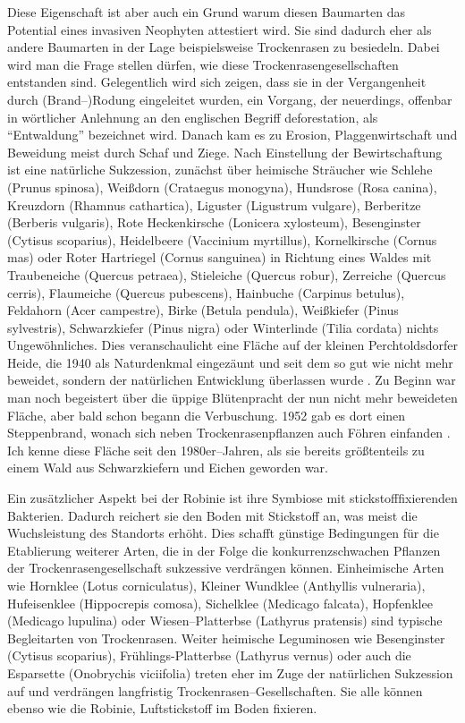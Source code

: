 \documentclass[twocolumn]{scrartcl}
\begin{document}
Diese Eigenschaft ist aber auch ein Grund warum diesen Baumarten das Potential
eines invasiven Neophyten attestiert wird. Sie sind dadurch eher als andere
Baumarten in der Lage beispielsweise Trockenrasen zu besiedeln. Dabei wird man
die Frage stellen dürfen, wie diese Trockenrasengesellschaften entstanden sind.
Gelegentlich wird sich zeigen, dass sie in der Vergangenheit durch
(Brand\mbox{--)}Rodung eingeleitet wurden, ein Vorgang, der neuerdings, offenbar
in wörtlicher Anlehnung an den englischen Begriff deforestation, als
\enquote{Entwaldung} bezeichnet wird. Danach kam es zu Erosion,
Plaggenwirtschaft und Beweidung meist durch Schaf und Ziege. Nach Einstellung
der Bewirtschaftung ist eine natürliche Sukzession, zunächst über heimische
Sträucher wie Schlehe (Prunus spinosa), Weißdorn (Crataegus monogyna), Hundsrose
(Rosa canina), Kreuzdorn (Rhamnus cathartica), Liguster (Ligustrum vulgare),
Berberitze (Berberis vulgaris), Rote Heckenkirsche (Lonicera xylosteum),
Besenginster (Cytisus scoparius), Heidelbeere (Vaccinium myrtillus),
Kornelkirsche (Cornus mas) oder Roter Hartriegel (Cornus sanguinea) in Richtung
eines Waldes mit Traubeneiche (Quercus petraea), Stieleiche (Quercus robur),
Zerreiche (Quercus cerris), Flaumeiche (Quercus pubescens), Hainbuche (Carpinus
betulus), Feldahorn (Acer campestre), Birke (Betula pendula), Weißkiefer (Pinus
sylvestris), Schwarzkiefer (Pinus nigra) oder Winterlinde (Tilia cordata) nichts
Ungewöhnliches. Dies veranschaulicht eine Fläche auf der kleinen
Perchtoldsdorfer Heide, die 1940 als Naturdenkmal eingezäunt und seit dem so gut
wie nicht mehr beweidet, sondern der natürlichen Entwicklung überlassen wurde
\citep{rosenkranz1953heide}. Zu Beginn war man noch begeistert über die üppige
Blütenpracht der nun nicht mehr beweideten Fläche, aber bald schon begann die
Verbuschung. 1952 gab es dort einen Steppenbrand, wonach sich neben
Trockenrasenpflanzen auch Föhren einfanden \citep{rosenkranz1953heideBrand}. Ich
kenne diese Fläche seit den 1980er--Jahren, als sie bereits größtenteils zu
einem Wald aus Schwarzkiefern und Eichen geworden war.

Ein zusätzlicher Aspekt bei der Robinie ist ihre Symbiose mit
stickstofffixierenden Bakterien. Dadurch reichert sie den Boden mit Stickstoff
an, was meist die Wuchsleistung des Standorts erhöht. Dies schafft günstige
Bedingungen für die Etablierung weiterer Arten, die in der Folge die
konkurrenzschwachen Pflanzen der Trockenrasengesellschaft sukzessive verdrängen
können. Einheimische Arten wie Hornklee (Lotus corniculatus), Kleiner Wundklee
(Anthyllis vulneraria), Hufeisenklee (Hippocrepis comosa), Sichelklee (Medicago
falcata), Hopfenklee (Medicago lupulina) oder Wiesen--Platterbse (Lathyrus
pratensis) sind typische Begleitarten von Trockenrasen.
Weiter heimische Leguminosen wie Besenginster (Cytisus scoparius),
Frühlings-Platterbse (Lathyrus vernus) oder auch die Esparsette (Onobrychis
viciifolia) treten eher im Zuge der natürlichen Sukzession auf und verdrängen
langfristig Trockenrasen--Gesellschaften. Sie alle können ebenso wie die
Robinie, Luftstickstoff im Boden fixieren.
\end{document}
